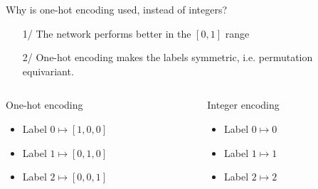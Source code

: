\documentclass[xcolor=pdftex,dvipsnames,table,mathserif]{beamer}
\begin{document}
\begin{frame}{}

\begin{quizzblock}{Why is one-hot encoding used, instead of integers?}
  \begin{itemize}
  \item[1/ ] The network performs better in the $[0,1]$ range
  \item[2/ ] One-hot encoding makes the labels symmetric, i.e. permutation equivariant.
  \end{itemize}
\end{quizzblock}

  \vspace{1em}

  \begin{columns}
    \begin{column}{.5\textwidth}
  \begin{block}{One-hot encoding}
    \begin{itemize}
    \item
      Label $0 \longmapsto [1,0,0]$
    \item
      Label $1 \longmapsto [0,1,0]$
    \item
      Label $2 \longmapsto [0,0,1]$
    \end{itemize}
  \end{block}

    \end{column}

    \begin{column}{.5\textwidth}
  \begin{block}{Integer encoding}
    \begin{itemize}
    \item
      Label $0 \longmapsto 0$
    \item
      Label $1 \longmapsto 1$
    \item
      Label $2 \longmapsto 2$
    \end{itemize}
  \end{block}

    \end{column}
  \end{columns}

  \pause

  \vspace{1em}


\end{frame}
\end{document}
